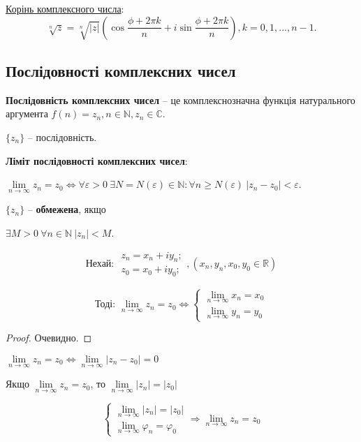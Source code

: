 \underline{Корінь комплексного числа}:
$$\sqrt[n]{z} = \sqrt[n]{|z|}(\cos\dfrac{\phi+2\pi k}{n} + i\sin\dfrac{\phi+2\pi k}{n}), k=0,1,...,n-1.$$



\subsection{Послідовності комплексних чисел}

\textbf{Послідовність комплексних чисел} -- це комплекснозначна функція натурального аргумента $f(n) = z_n, n\in\mathbb{N}, z_n\in\mathbb{C}$.

$\{z_n\}$ -- послідовність.

\textbf{Ліміт послідовності комплексних чисел}:

$\lim\limits_{n\rightarrow\infty} z_n = z_0 \Leftrightarrow \forall\varepsilon > 0 ~ \exists N = N ( \varepsilon ) \in\mathbb{N} : \forall n \geqslant N(\varepsilon) ~ |z_n-z_0|<\varepsilon$.

$\{z_n\}$ -- \textbf{обмежена}, якщо 

$\exists M>0 ~ \forall n \in \mathbb{N} ~ |z_n|<M$.

\begin{theorem}
$$
\text{Нехай: } \begin{array}{l}
z_n=x_n+iy_n; \\
z_0=x_0+iy_0;
\end{array}, 
(x_n,y_n,x_0,y_0 \in \mathbb{R})
$$

$$
\text{Тоді: }\lim\limits_{n\rightarrow\infty} z_n = z_0 \Leftrightarrow 
\left\{ \begin{array}{l}
\lim\limits_{n\rightarrow\infty} x_n = x_0 \\
\lim\limits_{n\rightarrow\infty} y_n = y_0
\end{array}\right.
$$
\end{theorem}
\begin{proof}
Очевидно.
\end{proof}

\begin{claim}
$\lim\limits_{n\rightarrow\infty} z_n = z_0 \Leftrightarrow \lim\limits_{n\rightarrow\infty} |z_n-z_0| = 0$
\end{claim}

\begin{theorem}
Якщо $\lim\limits_{n\rightarrow\infty} z_n = z_0$, то $\lim\limits_{n\rightarrow\infty} |z_n| = |z_0|$
\end{theorem}

\begin{theorem}
$$ 
\left\{ \begin{array}{l}
\lim\limits_{n\rightarrow\infty} |z_n| = |z_0| \\
\lim\limits_{n\rightarrow\infty} \varphi_n = \varphi_0
\end{array}\right.
\Rightarrow \lim\limits_{n\rightarrow\infty} z_n = z_0
$$
\end{theorem}
